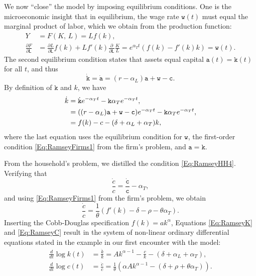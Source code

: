 \documentclass[graybox]{svmult}
\begin{document}
\smallskip

We now ``close'' the model by imposing equilibrium conditions.  One is the microeconomic insight that in equilibrium, the wage rate $\mathtt{w}(t)$ must equal the marginal product of labor, which we obtain from the production function:
\begin{align*}
Y &= F(K,\, L) = L f(k),\\
\frac{\partial F}{\partial \mathsf{L}} &= \frac{\partial L}{\partial \mathsf{L}} f(k) + L f'(k) \frac{\partial}{\partial\mathsf{L}} \frac{K}{L} = e^{\alpha_T t}(f(k)-f'(k)k) = \mathtt{w}(t).
\end{align*}
The second equilibrium condition states that assets equal capital $\mathtt{a}(t) = \mathtt{k}(t)$ for all $t$, and thus
\[
\dot{\mathtt{k}} = \dot{\mathtt{a}} = (r-\alpha_L) \mathtt{a} + \mathtt{w} - \mathtt{c}.
\]
By definition of $\mathtt{k}$ and $k$, we have
\begin{align}
\dot{k} &= \dot{\mathtt{k}} e^{-\alpha_T t} - \mathtt{k} \alpha_T e^{-\alpha_T t},\notag\\
 &= ((r-\alpha_L) \mathtt{a} + \mathtt{w} - \mathtt{c})e^{-\alpha_T t} - \mathtt{k} \alpha_T e^{-\alpha_T t},\notag\\
 &= f(k) - c - (\delta + \alpha_L + \alpha_T) k,\label{Eq:RamseyK}
\end{align}
where the last equation uses the equilibrium condition for $\mathtt{w}$, the first-order condition \eqref{Eq:RamseyFirms1} from the firm's problem, and $\mathtt{a}=\mathtt{k}$.

\smallskip

From the household's problem, we distilled the condition \eqref{Eq:RamseyHH4}. Verifying that
\[
\frac{\dot{c}}{c} = \frac{\dot{\mathtt{c}}}{\mathtt{c}} - \alpha_T,
\]
and using \eqref{Eq:RamseyFirms1} from the firm's problem, we obtain
\begin{equation}\label{Eq:RamseyC}
\frac{\dot{c}}{c} = \frac{1}{\theta} (f'(k) - \delta - \rho - \theta\alpha_T).
\end{equation}
Inserting the Cobb-Douglas specification $f(k) = ak^\alpha$, Equations \eqref{Eq:RamseyK} and \eqref{Eq:RamseyC} result in the system of non-linear ordinary differential equations stated in the example in our first encounter with the model:
\begin{align*}
\frac{d}{dt} \log k(t) &= \frac{\dot{k}}{k} = A k^{\alpha-1} - \frac{c}{k} - (\delta + \alpha_L + \alpha_T),\\
\frac{d}{dt} \log c(t) &= \frac{\dot{c}}{c} =\frac{1}{\theta} \left( \alpha A k^{\alpha-1} - (\delta + \rho + \theta \alpha_T) \right).
\end{align*}
\end{document}
